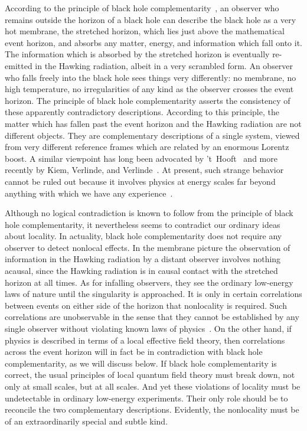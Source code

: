 According to the principle of black hole
complementarity~, an observer who remains outside
the horizon of a black hole can describe the black hole as a very
hot membrane, the stretched horizon, which lies
just above the mathematical event horizon, and absorbs any
matter, energy, and information which fall onto it.  The information
which is absorbed by the stretched horizon is eventually re-emitted
in the Hawking radiation, albeit in a very
scrambled form.  An observer who falls freely into the black hole
sees things very differently: no membrane, no high temperature, no
irregularities of any kind as the observer crosses the event horizon.
 The principle of black hole complementarity asserts the consistency
of these apparently contradictory descriptions.  According to this
principle, the matter which has fallen past the event horizon and the
Hawking radiation are not different objects.  They are complementary
descriptions of a single system, viewed from very different reference
frames which are related by an enormous Lorentz boost.  A similar
viewpoint has long been advocated by 't~Hooft~ and more
recently by Kiem, Verlinde, and Verlinde~.
At present, such strange behavior cannot be
ruled out because it involves physics at energy scales far beyond
anything with which we have any experience~.

Although no logical contradiction is known to follow from the
principle of black hole complementarity, it nevertheless seems to
contradict our ordinary ideas about locality.
In actuality, black hole complementarity does not require any
observer
to detect nonlocal effects.  In the membrane picture the
observation of information in the Hawking radiation by a distant
observer involves nothing acausal, since the Hawking radiation is in
causal contact with the stretched horizon at all times.
As for infalling observers, they see the ordinary
low-energy laws of nature until the singularity is approached.  It is
only in certain correlations between events on either
side of the horizon that nonlocality is required.  Such correlations
are unobservable in the sense that they cannot be established by any
single observer without violating known laws of physics~.
On the other hand, if physics is described in terms of a local
effective field theory, then correlations across the event horizon
will in fact be in contradiction with black hole complementarity,
as we will discuss below.  If black hole complementarity is correct,
the usual principles of local quantum field theory must break
down, not only at small scales, but at all scales.  And yet these
violations of locality must be undetectable in ordinary low-energy
experiments.  Their only role should be to reconcile the two
complementary descriptions.  Evidently, the nonlocality must be of
an extraordinarily special and subtle kind.

